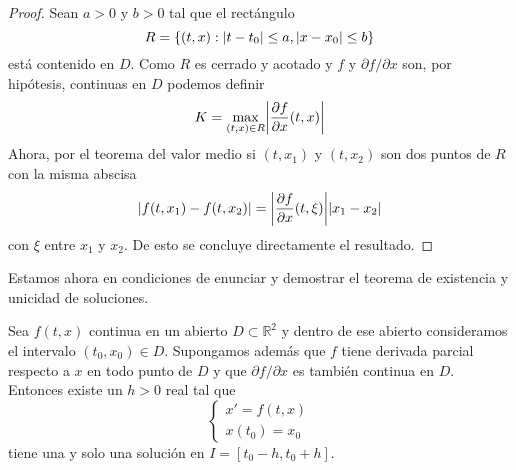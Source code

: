 \documentclass[../ecuaciones_diferenciales.tex]{subfiles}
\begin{document}
\begin{proof}
    Sean \(a > 0\) y \(b > 0\) tal que el rectángulo
    \[
        R = \{(t, x) : \abs{t - t_0} \leq a, \abs{x - x_0} \leq b\}
    \]
    está contenido en \(D\). Como \(R\) es cerrado y acotado y \(f\) y \(\partial f / \partial x\)
    son, por hipótesis, continuas en \(D\) podemos definir
    \[
        K = \max_{(t, x) \in R} \abs{\frac{\partial f}{\partial x}(t, x)}
    \]
    Ahora, por el teorema del valor medio si \((t, x_1)\) y \((t, x_2)\) son dos
    puntos de \(R\) con la misma abscisa
    \[
        \abs{f(t, x_1) - f(t, x_2)} = \abs{\frac{\partial f}{\partial x}(t, \xi)} \abs{x_1 - x_2}
    \]
    con \(\xi\) entre \(x_1\) y \(x_2\). De esto se concluye directamente el resultado.
\end{proof}

Estamos ahora en condiciones de enunciar 
y demostrar el teorema de existencia y unicidad de soluciones.

\begin{theorem}\label{theorem:ex_unicidad:teoria:teorema}
    Sea \(f(t, x)\) continua en un abierto \(D \subset \mathbb{R}^2\) y dentro de ese abierto
    consideramos el intervalo \((t_0, x_0) \in D\). Supongamos además que \(f\) tiene derivada parcial respecto a \(x\) en todo punto de \(D\)
    y que \(\partial f / \partial x\) es también continua en \(D\). Entonces existe un \(h > 0\) real
    tal que
    \begin{equation}\label{eq:ex_unicidad:teoria:pvi}
        \begin{cases}
            x' = f(t, x) \\
            x(t_0) = x_0
        \end{cases}
    \end{equation}
    tiene una y solo una solución en \(I = [t_0 - h, t_0 + h]\).
\end{theorem}
\end{document}
